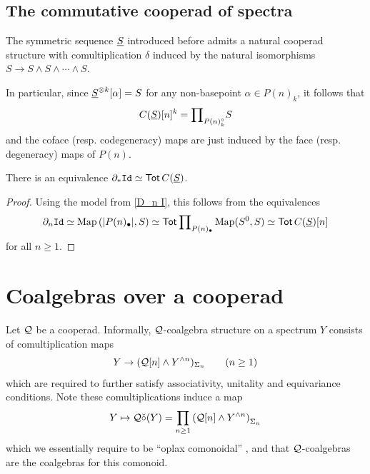 \subsection{The commutative cooperad of spectra} \label{com-coop}
The symmetric sequence $\underline{S}$ introduced before admits a natural cooperad structure with comultiplication $\delta$ induced by the natural isomorphisms $S\to S\wedge S\wedge \cdots \wedge S$.

In particular, since $\underline{S}^{\otimes k}[\alpha]=S$ for any non-basepoint $\alpha\in P(n)_k$, it follows that 
\[ C(\underline{S})[n]^k= {\prod}_{P(n)^{\circ}_{k}} S\]
and the coface (resp. codegeneracy) maps are just induced by the face (resp. degeneracy) maps of $P(n)$. 

\begin{proposition} \label{prop:model-equiv}
    There is an equivalence $\partial_* \mathtt{Id}\simeq \operatorname{\mathsf{Tot}} C(\underline{S})$.
\end{proposition}

\begin{proof}
    Using the model from \eqref{D_n I}, this follows from the equivalences \begin{align*}
        \partial_n \mathtt{Id} \simeq \operatorname{Map} \left(|P(n)_{\bullet}|, S\right) 
        \simeq \operatorname{\mathsf{Tot}} {\prod}_{P(n)_{\bullet}} \operatorname{Map}(S^0, S) 
         \simeq \operatorname{\mathsf{Tot}} C(\underline{S})[n]
    \end{align*} 
    for all $n\geq 1$.
\end{proof}


\section{Coalgebras over a cooperad}
Let $\mathcal{Q}$ be a cooperad. Informally, $\mathcal{Q}$-coalgebra structure on a spectrum $Y$ consists of comultiplication maps \[ Y\to (\mathcal{Q}[n] \wedge Y^{\wedge n} )_{\Sigma_n} \quad \quad (n\geq 1)\] which are required to further satisfy associativity, unitality and equivariance conditions. Note these comultiplications induce a map \[ Y\mapsto \mathcal{Q}\check{\circ} (Y)= \prod_{n\geq 1}\left( \mathcal{Q}[n]\wedge Y^{\wedge n}\right)_{\Sigma_n}\] which we essentially require to be ``oplax comonoidal'' \cite{Day-St}, and that $\mathcal{Q}$-coalgebras are the coalgebras for this comonoid. 


